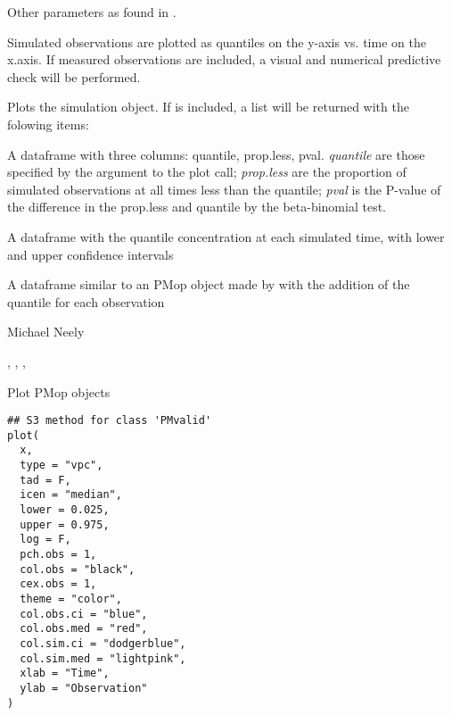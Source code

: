 \documentclass[a4paper]{book}
\begin{document}
\begin{Arguments}
\begin{ldescription}
\item[\code{...}] Other parameters as found in .
\end{ldescription}
\end{Arguments}
%
\begin{Details}\relax
Simulated observations are plotted as quantiles on the y-axis vs. time on the x.axis.  If measured
observations are included, a visual and numerical predictive check will be performed.
\end{Details}
%
\begin{Value}
Plots the simulation object.  If  is included, a list will be returned with
the folowing items:
\begin{ldescription}
\item[\code{npc}] A dataframe with three columns: quantile, prop.less, pval.  \emph{quantile} are those specified
by the  argument to the plot call; \emph{prop.less} are the proportion of simulated
observations at all times less than the quantile; \emph{pval} is the P-value of the difference in the 
prop.less and quantile by the beta-binomial test.
\item[\code{simsum}] A dataframe with the quantile concentration at each simulated time,
with lower and upper confidence intervals
\item[\code{obs}] A dataframe similar to an PMop object made by 
with the addition of the quantile for each observation
\end{ldescription}
\end{Value}
%
\begin{Author}\relax
Michael Neely
\end{Author}
%
\begin{SeeAlso}\relax
{}, , , 
\end{SeeAlso}
%
\begin{Description}\relax
Plot PMop objects
\end{Description}
%
\begin{Usage}
\begin{verbatim}
## S3 method for class 'PMvalid'
plot(
  x,
  type = "vpc",
  tad = F,
  icen = "median",
  lower = 0.025,
  upper = 0.975,
  log = F,
  pch.obs = 1,
  col.obs = "black",
  cex.obs = 1,
  theme = "color",
  col.obs.ci = "blue",
  col.obs.med = "red",
  col.sim.ci = "dodgerblue",
  col.sim.med = "lightpink",
  xlab = "Time",
  ylab = "Observation"
)
\end{verbatim}
\end{Usage}
\end{document}
